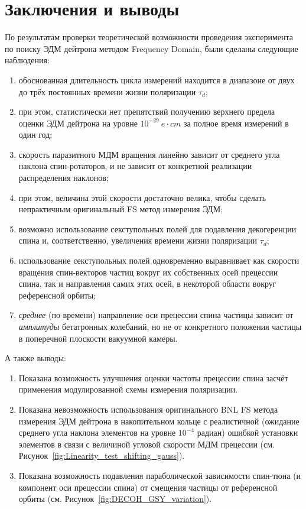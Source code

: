 \documentclass{report}
\newcommand{\LTd}{\tau_d}
\newcommand{\home}{\string~}
\begin{document}
\chapter{Заключения и выводы}
По результатам проверки теоретической возможности проведения эксперимента по поиску ЭДМ дейтрона методом Frequency Domain, были сделаны следующие наблюдения:
\begin{enumerate}
\item обоснованная длительность цикла измерений находится в диапазоне от двух до трёх постоянных времени жизни поляризации $\LTd$;
\item при этом, статистически нет препятствий получению верхнего предела оценки ЭДМ дейтрона на уровне $10^{-29}~e\cdot cm$ за полное время измерений в один год;
\item скорость паразитного МДМ вращения линейно зависит от среднего угла наклона спин-ротаторов, и не зависит от конкретной реализации распределения наклонов;
\item при этом, величина этой скорости достаточно велика, чтобы сделать непрактичным оригинальный FS метод измерения ЭДМ;
\item возможно использование секступольных полей для подавления декогеренции спина и, соответственно, увеличения времени жизни поляризации $\LTd$;
\item использование секступольных полей одновременно выравнивает как скорости вращения спин-векторов частиц вокруг их собственных осей прецессии спина, так и направления самих этих осей, в некоторой области вокруг референсной орбиты;
\item \emph{среднее} (по времени) направление оси прецессии спина частицы зависит от \emph{амплитуды} бетатронных колебаний, но не от конкретного положения частицы в поперечной плоскости вакуумной камеры.
\end{enumerate}

А также выводы:
\begin{enumerate}
  \item Показана возможность улучшения оценки частоты прецессии спина засчёт применения модулированной схемы измерения поляризации.

\item Показана невозможность использования оригинального BNL FS метода измерения ЭДМ дейтрона в накопительном кольце с реалистичной (ожидание среднего угла наклона элементов на уровне $10^{-4}$ радиан) ошибкой установки элементов в связи с величиной угловой скорости МДМ прецессии (см. Рисунок~\ref{fig:Linearity_test_shifting_gauss}).

\item Показана возможность подавления параболической зависимости спин-тюна (и компонент оси прецессии спина) от смещения частицы от референсной орбиты (см. Рисунок~\ref{fig:DECOH_GSY_variation}).
\end{enumerate}




\end{document}
